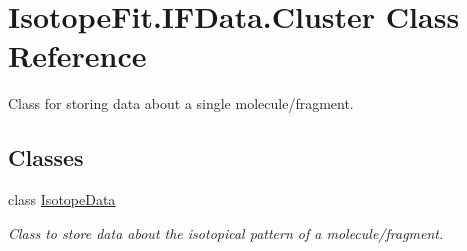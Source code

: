 \hypertarget{class_isotope_fit_1_1_i_f_data_1_1_cluster}{}\section{Isotope\+Fit.\+I\+F\+Data.\+Cluster Class Reference}
\label{class_isotope_fit_1_1_i_f_data_1_1_cluster}


Class for storing data about a single molecule/fragment.  


\subsection*{Classes}
\begin{DoxyCompactItemize}
\item 
class \hyperlink{class_isotope_fit_1_1_i_f_data_1_1_cluster_1_1_isotope_data}{Isotope\+Data}
\begin{DoxyCompactList}\small\item\em Class to store data about the isotopical pattern of a molecule/fragment. \end{DoxyCompactList}\end{DoxyCompactItemize}

